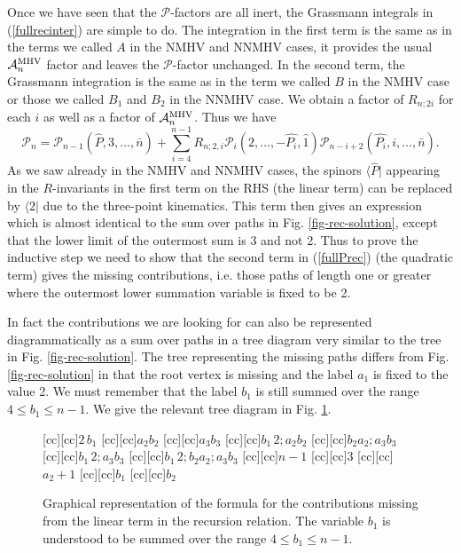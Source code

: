 \documentclass[12pt]{article}
\def \be  {\begin{equation}}
\def \ee  {\end{equation}}
\begin{document}
{Once we have seen that the $\mathcal{P}$-factors are all inert, the Grassmann integrals in (\ref{fullrecinter}) are simple to do. The integration in the first term is the same as in the terms we called $A$ in the NMHV and NNMHV cases, it provides the usual $\mathcal{A}_n^{\rm MHV}$ factor and leaves the $\mathcal{P}$-factor unchanged. In the second term, the Grassmann integration is the same as in the term we called $B$ in the NMHV case or those we called $B_1$ and $B_2$ in the NNMHV case. We obtain a factor of $R_{n;2i}$ for each $i$ as well as a factor of $\mathcal{A}_n^{\rm MHV}$. Thus we have
\be
\mathcal{P}_n = \mathcal{P}_{n-1}(\hat{P},3,\ldots,\bar{n}) + \sum_{i=4}^{n-1} R_{n;2,i} \mathcal{P}_i(2,\ldots,-\hat{P_i},\hat{1}) \mathcal{P}_{n-i+2}(\hat{P_i},i,\ldots,\bar{n}).
\label{fullPrec}
\ee
As we saw already in the NMHV and NNMHV cases, the spinors $\langle \hat{P} |$ appearing in the $R$-invariants in the first term on the RHS (the linear term) can be replaced by $\langle 2|$ due to the three-point kinematics.
This term then gives an expression which is almost identical to the sum over paths in Fig. \ref{fig-rec-solution}, except that the lower limit of the outermost sum is 3 and not 2. Thus to prove the inductive step we need to show that the second term in (\ref{fullPrec}) (the quadratic term) gives the missing contributions, i.e. those paths of length one or greater where the outermost lower summation variable is fixed to be 2. 

In fact the contributions we are looking for can also be represented diagrammatically as a sum over paths in a tree diagram very similar to the tree in Fig. \ref{fig-rec-solution}. The tree representing the missing paths differs from Fig. \ref{fig-rec-solution} in that the root vertex is missing and the label $a_1$ is fixed to the value 2. We must remember that the label $b_1$ is still summed over the range $4\leq b_1 \leq n-1$. We give the relevant tree diagram in Fig. \ref{missingpathstree}.

\begin{figure}
[cc][cc]{$2\, b_{1}$}
[cc][cc]{$a_{2}b_{2}$}
[cc][cc]{$a_{3}b_{3}$}
[cc][cc]{$b_{1}\,2;a_{2}b_{2}$}
[cc][cc]{$b_{2}a_{2};a_{3}b_{3}$}
[cc][cc]{$b_{1}\,2;a_{3}b_{3}$}
[cc][cc]{$b_{1}\,2;b_{2}a_{2};a_{3}b_{3}$}
[cc][cc]{$n-1$}
[cc][cc]{$3$}
[cc][cc]{$a_{2}+1$}
[cc][cc]{$b_{1}$}
[cc][cc]{$b_{2}$}
 \centerline{{
}}  \caption[]{\small
  Graphical representation of the formula for the contributions missing from the linear term in the recursion relation. The variable $b_1$ is understood to be summed over the range $4\leq b_1 \leq n-1$.}
  \label{missingpathstree}
\end{figure}


}
\end{document}

